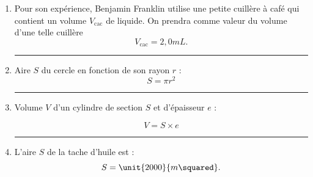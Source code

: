 \documentclass[12pt,a4paper]{article}
\begin{document}
\begin{enumerate}
\hrule{}
\vspace{5pt}
\item Pour son expérience, Benjamin Franklin utilise une petite cuillère à café qui contient un volume $V_\mathrm{cac}$ de liquide.
On prendra comme valeur du volume d'une telle cuillère
\[
V_\mathrm{cac} = \unit{2{,}0}{mL}.
\]

\hrule{}
\vspace{5pt}
\item 
\begin{multicols}{2}
Aire $S$ du cercle en fonction de son rayon $r$ :
\[
S = \pi r^2
\]
\hfill

\begin{center}
\end{center}
\end{multicols}

\hrule{}
\vspace{5pt}
\item Volume $V$ d'un cylindre de section $S$ et d'épaisseur $e$ :
\begin{multicols}{2}
\[
V = S \times e
\]
\hfill

\begin{center}
\end{center}
\end{multicols}

\hrule{}
\vspace{5pt}
\item
L'aire $S$ de la tache d'huile est :
\[
S = \unit{2000}{m\squared}.
\]


\end{enumerate}
\end{document}
